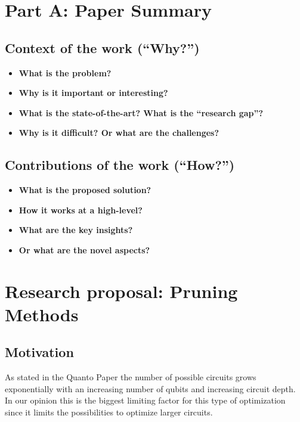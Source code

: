 \section{Part A: Paper Summary}

\subsection{Context of the work (``Why?'')}
\begin{itemize}
  \item \textbf{What is the problem?}
  \item \textbf{Why is it important or interesting?}
  \item \textbf{What is the state-of-the-art? What is the “research gap”?}
  \item \textbf{Why is it difficult? Or what are the challenges?}
\end{itemize}

\subsection{Contributions of the work (``How?'')}
\begin{itemize}
  \item \textbf{What is the proposed solution?}
  \item \textbf{How it works at a high-level?}
  \item \textbf{What are the key insights?}
  \item \textbf{Or what are the novel aspects?}
\end{itemize}

\section{Research proposal: Pruning Methods}
\subsection{Motivation}
As stated in the Quanto Paper the number of possible circuits grows exponentially with an increasing number of qubits and
increasing circuit depth. In our opinion this is the biggest limiting factor for this type of optimization since it limits the possibilities to optimize larger circuits.

